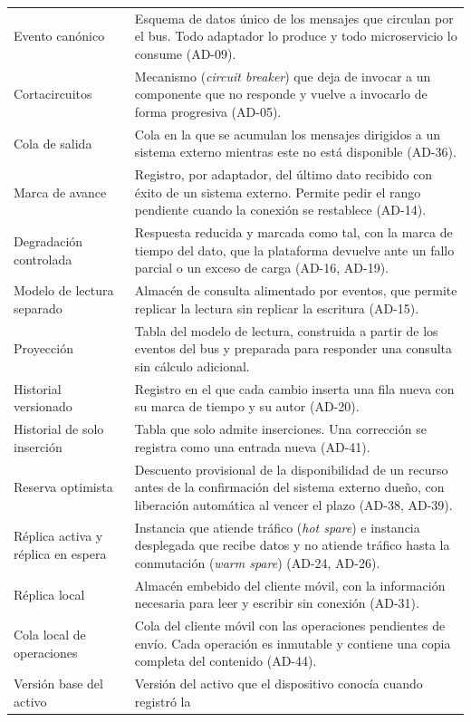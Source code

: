 \documentclass[11pt,letterpaper]{article}
\begin{document}
\begin{longtable}{L{3.8cm} L{12.0cm}}
Evento canónico & Esquema de datos único de los mensajes que circulan por el bus. Todo adaptador
lo produce y todo microservicio lo consume (AD-09). \\
Cortacircuitos & Mecanismo (\emph{circuit breaker}) que deja de invocar a un componente que no
responde y vuelve a invocarlo de forma progresiva (AD-05). \\
Cola de salida & Cola en la que se acumulan los mensajes dirigidos a un sistema externo mientras
este no está disponible (AD-36). \\
Marca de avance & Registro, por adaptador, del último dato recibido con éxito de un sistema
externo. Permite pedir el rango pendiente cuando la conexión se restablece (AD-14). \\
Degradación controlada & Respuesta reducida y marcada como tal, con la marca de tiempo del dato,
que la plataforma devuelve ante un fallo parcial o un exceso de carga (AD-16, AD-19). \\
Modelo de lectura separado & Almacén de consulta alimentado por eventos, que permite replicar la
lectura sin replicar la escritura (AD-15). \\
Proyección & Tabla del modelo de lectura, construida a partir de los eventos del bus y preparada
para responder una consulta sin cálculo adicional. \\
Historial versionado & Registro en el que cada cambio inserta una fila nueva con su marca de tiempo
y su autor (AD-20). \\
Historial de solo inserción & Tabla que solo admite inserciones. Una corrección se registra como
una entrada nueva (AD-41). \\
Reserva optimista & Descuento provisional de la disponibilidad de un recurso antes de la
confirmación del sistema externo dueño, con liberación automática al vencer el plazo (AD-38,
AD-39). \\
Réplica activa y réplica en espera & Instancia que atiende tráfico (\emph{hot spare}) e instancia
desplegada que recibe datos y no atiende tráfico hasta la conmutación (\emph{warm spare}) (AD-24,
AD-26). \\
Réplica local & Almacén embebido del cliente móvil, con la información necesaria para leer y
escribir sin conexión (AD-31). \\
Cola local de operaciones & Cola del cliente móvil con las operaciones pendientes de envío. Cada
operación es inmutable y contiene una copia completa del contenido (AD-44). \\
Versión base del activo & Versión del activo que el dispositivo conocía cuando registró la

\end{longtable}
\end{document}

